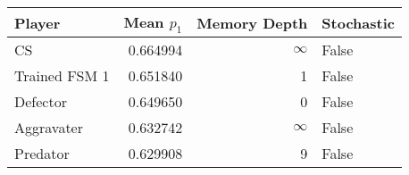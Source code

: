 \begin{tabular}{lrrl}
\toprule
        Player &  Mean $p_1$ &  Memory Depth & Stochastic \\
\midrule
            CS &    0.664994 &            \(\infty\) &      False \\
 Trained FSM 1 &    0.651840 &             1 &      False \\
      Defector &    0.649650 &             0 &      False \\
    Aggravater &    0.632742 &            \(\infty\) &      False \\
      Predator &    0.629908 &             9 &      False \\
\bottomrule
\end{tabular}
